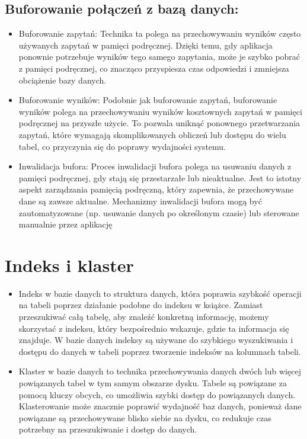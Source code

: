 \documentclass[letterpaper,10pt,polish]{sphinxmanual}
\begin{document}
\section{Buforowanie połączeń z bazą danych:}
\label{\detokenize{rozdzialy/rozdzial1:buforowanie-polaczen-z-baza-danych}}\begin{itemize}
\item {} 
\sphinxAtStartPar
Buforowanie zapytań: Technika ta polega na przechowywaniu wyników często używanych zapytań w pamięci podręcznej. Dzięki temu, gdy aplikacja ponownie potrzebuje wyników tego samego zapytania, może je szybko pobrać z pamięci podręcznej, co znacząco przyspiesza czas odpowiedzi i zmniejsza obciążenie bazy danych.

\item {} 
\sphinxAtStartPar
Buforowanie wyników: Podobnie jak buforowanie zapytań, buforowanie wyników polega na przechowywaniu wyników kosztownych zapytań w pamięci podręcznej na przyszłe użycie. To pozwala uniknąć ponownego przetwarzania zapytań, które wymagają skomplikowanych obliczeń lub dostępu do wielu tabel, co przyczynia się do poprawy wydajności systemu.

\item {} 
\sphinxAtStartPar
Inwalidacja bufora: Proces inwalidacji bufora polega na usuwaniu danych z pamięci podręcznej, gdy stają się przestarzałe lub nieaktualne. Jest to istotny aspekt zarządzania pamięcią podręczną, który zapewnia, że przechowywane dane są zawsze aktualne. Mechanizmy inwalidacji bufora mogą być zautomatyzowane (np. usuwanie danych po określonym czasie) lub sterowane manualnie przez aplikację

\end{itemize}

\sphinxstepscope


\chapter{Indeks i klaster}
\label{\detokenize{rozdzialy/rozdzial2:indeks-i-klaster}}\label{\detokenize{rozdzialy/rozdzial2::doc}}\begin{itemize}
\item {} 
\sphinxAtStartPar
Indeks w bazie danych to struktura danych, która poprawia szybkość operacji na tabeli poprzez działanie podobne do indeksu w książce. Zamiast przeszukiwać całą tabelę, aby znaleźć konkretną informację, możemy skorzystać z indeksu, który bezpośrednio wskazuje, gdzie ta informacja się znajduje. W bazie danych indeksy są używane do szybkiego wyszukiwania i dostępu do danych w tabeli poprzez tworzenie indeksów na kolumnach tabeli.

\item {} 
\sphinxAtStartPar
Klaster w bazie danych to technika przechowywania danych dwóch lub więcej powiązanych tabel w tym samym obszarze dysku. Tabele są powiązane za pomocą kluczy obcych, co umożliwia szybki dostęp do powiązanych danych. Klasterowanie może znacznie poprawić wydajność baz danych, ponieważ dane powiązane są przechowywane blisko siebie na dysku, co redukuje czas potrzebny na przeszukiwanie i dostęp do danych.

\end{itemize}
\end{document}
